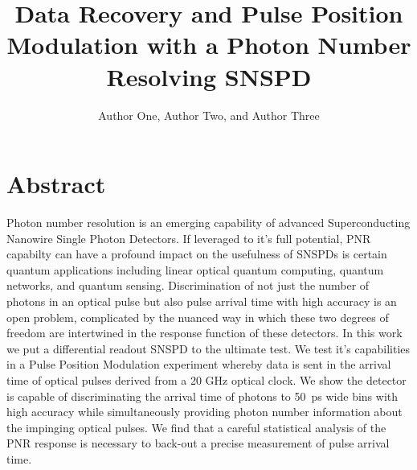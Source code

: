 \documentclass{optica-article}
\begin{document}
\title{Data Recovery and Pulse Position Modulation with a Photon Number Resolving SNSPD}

\author{Author One, Author Two, and Author Three}

\address{Peer Review, Publications Department, Optica Publishing Group, 2010 Massachusetts Avenue NW, Washington, DC 20036, USA\\
Publications Department, Optica Publishing Group, 2010 Massachusetts Avenue NW, Washington, DC 20036, USA\\
Currently with the Department of Electronic Journals, Optica Publishing Group, 2010 Massachusetts Avenue NW, Washington, DC 20036, USA}



\begin{abstract*} 

\end{abstract*}

\section{Abstract}

Photon number resolution is an emerging capability of advanced Superconducting Nanowire Single Photon Detectors. If leveraged to it's full potential, PNR capabilty can have a profound impact on the usefulness of SNSPDs is certain quantum applications including linear optical quantum computing, quantum networks, and quantum sensing. Discrimination of not just the number of photons in an optical pulse but also pulse arrival time with high accuracy is an open problem, complicated by the nuanced way in which these two degrees of freedom are intertwined in the response function of these detectors. In this work we put a differential readout SNSPD to the ultimate test. We test it's capabilities in a Pulse Position Modulation experiment whereby data is sent in the arrival time of optical pulses derived from a 20 GHz optical clock. We show the detector is capable of discriminating the arrival time of photons to 50~ps wide bins with high accuracy while simultaneously providing photon number information about the impinging optical pulses. We find that a careful statistical analysis of the PNR response is necessary to back-out a precise measurement of pulse arrival time.
\end{document}
